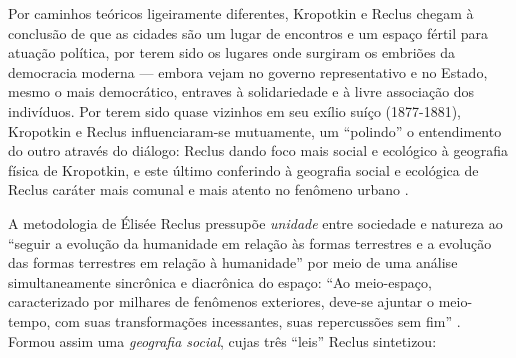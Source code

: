Por caminhos teóricos ligeiramente diferentes, Kropotkin e Reclus chegam à conclusão de que as cidades são um lugar de encontros e um espaço fértil para atuação política, por terem sido os lugares onde surgiram os embriões da democracia moderna --- embora vejam no governo representativo e no Estado, mesmo o mais democrático, entraves à solidariedade e à livre associação dos indivíduos. Por terem sido quase vizinhos em seu exílio suíço (1877-1881), Kropotkin e Reclus influenciaram-se mutuamente, um ``polindo'' o entendimento do outro através do diálogo: Reclus dando foco mais social e ecológico à geografia física de Kropotkin, e este último conferindo à geografia social e ecológica de Reclus caráter mais comunal e mais atento no fenômeno urbano \cite[p.~209-210]{WARD2010}.


A metodologia de Élisée Reclus pressupõe \textit{unidade} entre sociedade e natureza ao ``seguir a evolução da humanidade em relação às formas terrestres e a evolução das formas terrestres em relação à humanidade'' \cite[pp.~78-79]{reclus_renovacao_2010} por meio de uma análise simultaneamente sincrônica e diacrônica do espaço: ``Ao meio-espaço, caracterizado por milhares de fenômenos exteriores, deve-se ajuntar o meio-tempo, com suas transformações incessantes, suas repercussões sem fim'' \cite[p.~110]{RECLUS1905a}. Formou assim uma \textit{geografia social}, cujas três ``leis'' Reclus sintetizou:

